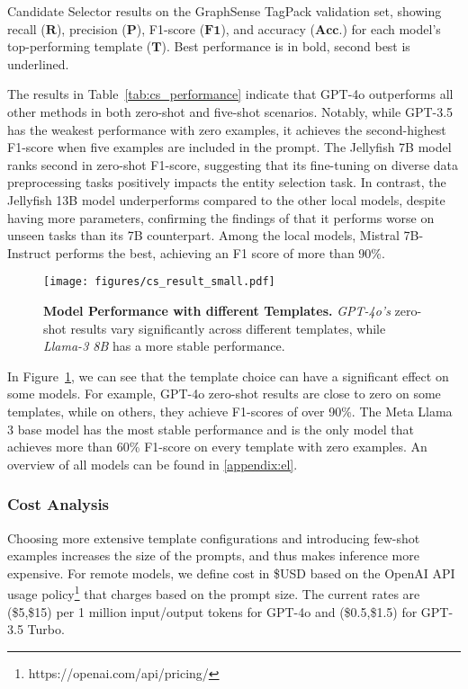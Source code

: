 \begin{table}
    \centering
    \caption{Candidate Selector results on the GraphSense TagPack validation set, showing recall ($\textbf{R}$), precision ($\textbf{P}$), F1-score ($\textbf{F1}$), and accuracy ($\textbf{Acc.}$) for each model’s top-performing template ($\textbf{T}$). Best performance is in bold, second best is underlined.}
        
    \label{tab:cs_performance}
\end{table}

The results in Table~\ref{tab:cs_performance} indicate that GPT-4o outperforms all other methods in both zero-shot and five-shot scenarios. Notably, while GPT-3.5 has the weakest performance with zero examples, it achieves the second-highest F1-score when five examples are included in the prompt. The Jellyfish 7B model ranks second in zero-shot F1-score, suggesting that its fine-tuning on diverse data preprocessing tasks positively impacts the entity selection task. In contrast, the Jellyfish 13B model underperforms compared to the other local models, despite having more parameters, confirming the findings of \cite{Zhang2024} that it performs worse on unseen tasks than its 7B counterpart. Among the local models, Mistral 7B-Instruct performs the best, achieving an F1 score of more than 90\%.

\begin{figure}
    \centering
    \texttt{[image: figures/cs\_result\_small.pdf]}
    \caption{\textbf{Model Performance with different Templates.} \emph{GPT-4o's} zero-shot results vary significantly across different templates, while \emph{Llama-3 8B} has a more stable performance.}
    \label{fig:cs_result}
\end{figure}

In Figure~\ref{fig:cs_result}, we can see that the template choice can have a significant effect on some models. For example, GPT-4o zero-shot results are close to zero on some templates, while on others, they achieve F1-scores of over 90\%. The Meta Llama 3 base model has the most stable performance and is the only model that achieves more than 60\% F1-score on every template with zero examples. An overview of all models can be found in \ref{appendix:el}.

\subsubsection{Cost Analysis}

Choosing more extensive template configurations and introducing few-shot examples increases the size of the prompts, and thus makes inference more expensive. For remote models, we define cost in \$USD based on the OpenAI API usage policy\footnote{https://openai.com/api/pricing/} that charges based on the prompt size. The current rates are (\$5,\$15) per 1 million input/output tokens for GPT-4o and (\$0.5,\$1.5) for GPT-3.5 Turbo. 

